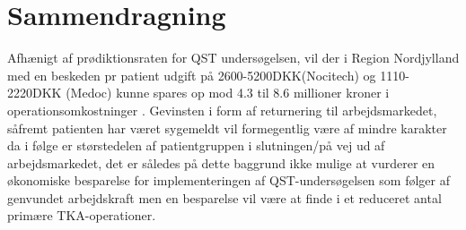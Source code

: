 \section{Sammendragning}

Afhænigt af prødiktionsraten for QST undersøgelsen, vil der i Region Nordjylland med en beskeden pr patient udgift på 2600-5200DKK(Nocitech) og 1110-2220DKK (Medoc) kunne spares op mod 4.3 til 8.6 millioner kroner i operationsomkostninger . Gevinsten i form af returnering til arbejdsmarkedet, såfremt patienten har været sygemeldt vil formegentlig være af mindre karakter da i følge  er størstedelen af patientgruppen i slutningen/på vej ud af arbejdsmarkedet, det er således på dette baggrund ikke mulige at vurderer en økonomiske besparelse for implementeringen af QST-undersøgelsen som følger af genvundet arbejdskraft men en besparelse vil være at finde i et reduceret antal primære TKA-operationer. 


